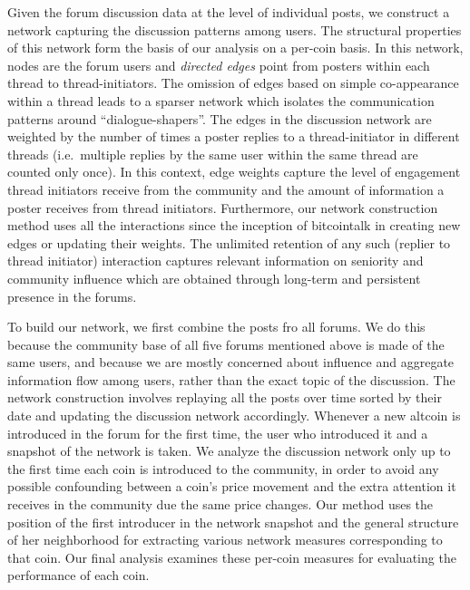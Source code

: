 
Given the forum discussion data at the level of individual posts, we  construct a network capturing the discussion patterns among users. The structural properties of this network form the basis of our analysis on a per-coin basis. In this network, nodes are the forum users and \textit{directed edges} point from posters within each thread to thread-initiators. The omission of edges based on simple co-appearance within a thread leads to a sparser network which isolates the communication patterns around ``dialogue-shapers''. The edges in the discussion network are weighted by the number of times a poster replies to a thread-initiator in different threads (i.e.~multiple replies by the same user within the same thread are counted only once).
In this context, edge weights capture the level of engagement thread initiators receive from the community and the amount of information a poster receives from thread initiators. Furthermore, our network construction method uses all the interactions since the inception of bitcointalk in creating new edges or updating their weights. The unlimited retention of any such (replier to thread initiator) interaction captures relevant information on seniority and community influence which are obtained through long-term and persistent presence in the forums. 

To build our network, we first combine the posts fro all forums. We do this because the community base of all five forums mentioned above is made of the same users, and because we are mostly concerned about influence and aggregate information flow among users, rather than the exact topic of the discussion.
The network construction involves replaying all the posts over time sorted by their date and updating the
discussion network accordingly. Whenever a new altcoin is introduced
in the forum for the first time, the user who introduced it and a snapshot of the network is taken. 
We analyze the discussion network only up to the first time each coin is introduced to the community, in order to avoid any possible confounding between a coin's price movement and the extra attention it receives in the community due the same price changes. Our method uses the position of the first introducer in the network snapshot and the general structure of her neighborhood for extracting various network measures corresponding to that coin. Our final analysis examines these per-coin measures for evaluating the performance of each coin.



